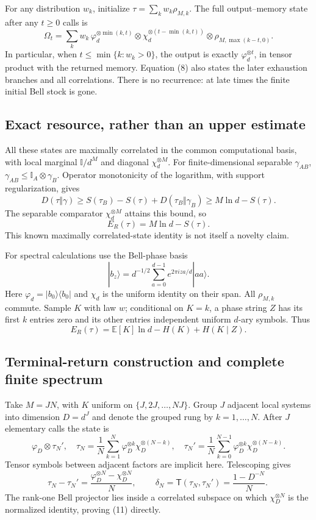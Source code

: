 \documentclass[11pt,a4paper]{article}
\newcommand{\ER}{E_R}
\newcommand{\dist}{\mathsf T}
\newcommand{\ph}{\varphi}
\newcommand{\I}{\mathbb I}
\begin{document}
For any distribution \(w_k\), initialize
\(\tau=\sum_kw_k\rho_{M,k}\). The full output--memory state after any
\(t\ge0\) calls is
\[
 \Omega_t=\sum_kw_k\,
 \ph_d^{\otimes\min(k,t)}
 \otimes\chi_d^{\otimes(t-\min(k,t))}
 \otimes\rho_{M,\max(k-t,0)}.                               \tag{8}
\]
In particular, when \(t\le\min\{k:w_k>0\}\), the output is exactly
\(\ph_d^{\otimes t}\), in tensor product with the returned memory.
Equation (8) also states the later exhaustion branches and all correlations.
There is no recurrence: at late times the finite initial Bell stock is gone.

\subsection{Exact resource, rather than an upper estimate}
All these states are maximally correlated in the common computational basis,
with local marginal \(\I/d^M\) and diagonal \(\chi_d^{\otimes M}\).
For finite-dimensional separable \(\gamma_{AB}\),
\(\gamma_{AB}\le\I_A\otimes\gamma_B\).
Operator monotonicity of the logarithm, with support regularization, gives
\[
 D(\tau\Vert\gamma)\ge S(\tau_B)-S(\tau)
                  +D(\tau_B\Vert\gamma_B)
 \ge M\ln d-S(\tau).
\]
The separable comparator \(\chi_d^{\otimes M}\) attains this bound, so
\[
 \boxed{\ \ER(\tau)=M\ln d-S(\tau).\ }                       \tag{9}
\]
This known maximally correlated-state identity is not itself a novelty claim.

For spectral calculations use the Bell-phase basis
\[
 |b_z\rangle=d^{-1/2}\sum_{a=0}^{d-1}e^{2\pi iza/d}|aa\rangle.
\]
Here \(\ph_d=|b_0\rangle\langle b_0|\) and \(\chi_d\) is the uniform identity
on their span. All \(\rho_{M,k}\) commute. Sample \(K\) with law \(w\);
conditional on \(K=k\), a phase string \(Z\) has its first \(k\) entries zero
and its other entries independent uniform \(d\)-ary symbols. Thus
\[
 \ER(\tau)=\mathbb E[K]\ln d-H(K)+H(K\mid Z).                \tag{10}
\]

\subsection{Terminal-return construction and complete finite spectrum}
Take \(M=JN\), with \(K\) uniform on \(\{J,2J,\ldots,NJ\}\).
Group \(J\) adjacent local systems into dimension \(D=d^J\) and denote the
grouped rung by \(k=1,\ldots,N\).
After \(J\) elementary calls the state is
\[
 \ph_D\otimes\tau_N',\quad
 \tau_N=\frac1N\sum_{k=1}^N\ph_D^{\otimes k}\chi_D^{\otimes(N-k)},
 \quad
 \tau_N'=\frac1N\sum_{k=0}^{N-1}\ph_D^{\otimes k}\chi_D^{\otimes(N-k)}.
\]
Tensor symbols between adjacent factors are implicit here.
Telescoping gives
\[
 \tau_N-\tau_N'=\frac{\ph_D^{\otimes N}-\chi_D^{\otimes N}}N,\qquad
 \boxed{\ \delta_N=\dist(\tau_N,\tau_N')=\frac{1-D^{-N}}N.\ } \tag{11}
\]
The rank-one Bell projector lies inside a correlated subspace on which
\(\chi_D^{\otimes N}\) is the normalized identity, proving (11) directly.
\end{document}
